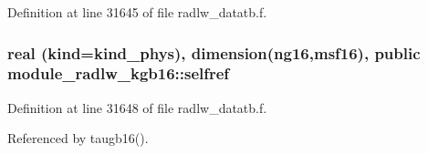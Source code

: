Definition at line 31645 of file radlw\+\_\+datatb.\+f.

\subsubsection[{\texorpdfstring{selfref}{selfref}}]{\setlength{\rightskip}{0pt plus 5cm}real (kind=kind\+\_\+phys), dimension(ng16,{\bf msf16}), public module\+\_\+radlw\+\_\+kgb16\+::selfref}\hypertarget{namespacemodule__radlw__kgb16_afaa2554e1161bd6c983ce630d39d703a}{}\label{namespacemodule__radlw__kgb16_afaa2554e1161bd6c983ce630d39d703a}


Definition at line 31648 of file radlw\+\_\+datatb.\+f.



Referenced by taugb16().

